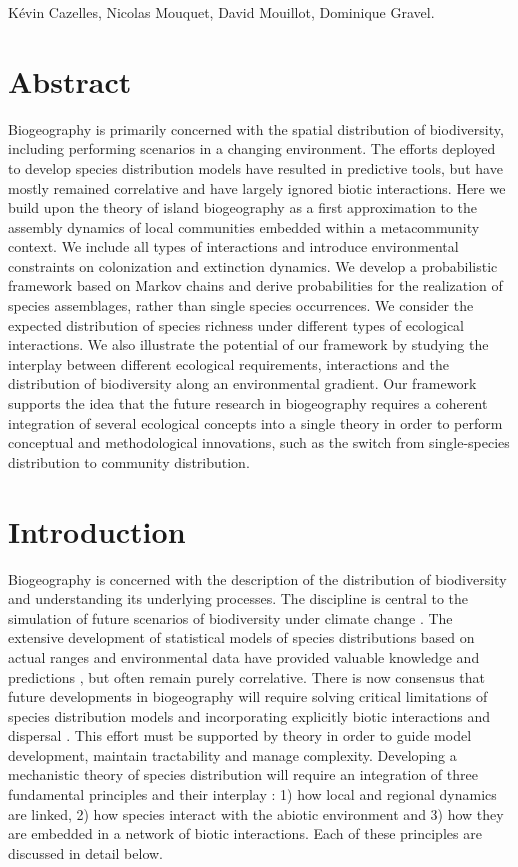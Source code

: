 Kévin Cazelles, Nicolas Mouquet, David Mouillot, Dominique Gravel.


\section{Abstract}

Biogeography is primarily concerned with the spatial distribution of biodiversity, including performing scenarios in a changing environment. The efforts deployed to develop species distribution models have resulted in predictive tools, but have mostly remained correlative and have largely ignored biotic interactions. Here we build upon the theory of island biogeography as a first approximation to the assembly dynamics of local communities embedded within a metacommunity context. We include all types of interactions and introduce environmental constraints on colonization and extinction dynamics. We develop a probabilistic framework based on Markov chains and derive probabilities for the realization of species assemblages, rather than single species occurrences. We consider the expected distribution of species richness under different types of ecological interactions. We also illustrate the potential of our framework by studying the interplay between different ecological requirements, interactions and the distribution of biodiversity along an environmental gradient. Our framework supports the idea that the future research in biogeography requires a coherent integration of several ecological concepts into a single theory in order to perform conceptual and methodological innovations, such as the switch from single-species distribution to community distribution.


\section{Introduction}

Biogeography is concerned with the description of the distribution of biodiversity and understanding its underlying processes. The discipline is central to the simulation of future scenarios of biodiversity under climate change \citep{Thuiller2013}. The extensive development of statistical models of species distributions based on actual ranges and environmental data have provided valuable knowledge and predictions \citep{Kearney2004}, but often remain purely correlative. There is now consensus that future developments in biogeography will require solving critical limitations of species distribution models \citep{Kissling2012} and incorporating explicitly biotic interactions and dispersal \citep{Lavergne2010}. This effort must be supported by theory in order to guide model development, maintain tractability and manage complexity. Developing a mechanistic theory of species distribution will require an integration of three fundamental principles and their interplay \citep{Thuiller2013}: 1) how local and regional dynamics are linked, 2) how species interact with the abiotic environment and 3) how they are embedded in a network of biotic interactions. Each of these principles are discussed in detail below.

